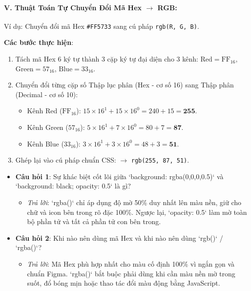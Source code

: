 \documentclass[11pt,oneside]{book}
\newcommand{\codeinline}[1]{\textcolor{accentOrange}{\texttt{#1}}}
\begin{document}
\paragraph{V. Thuật Toán Tự Chuyển Đổi Mã Hex $\rightarrow$ RGB:}
\begin{conceptBox}
Ví dụ: Chuyển đổi mã Hex \codeinline{\#FF5733} sang cú pháp \codeinline{rgb(R, G, B)}.

\textbf{Các bước thực hiện}:
\begin{enumerate}[leftmargin=1.5em, itemsep=2pt]
    \item Tách mã Hex 6 ký tự thành 3 cặp ký tự đại diện cho 3 kênh:
    $\text{Red} = \text{FF}_{16}$, $\text{Green} = 57_{16}$, $\text{Blue} = 33_{16}$.
    \item Chuyển đổi từng cặp số Thập lục phân (Hex - cơ số 16) sang Thập phân (Decimal - cơ số 10):
    \begin{itemize}[leftmargin=1.2em]
        \item Kênh Red ($\text{FF}_{16}$): $15 \times 16^1 + 15 \times 16^0 = 240 + 15 = \mathbf{255}$.
        \item Kênh Green ($57_{16}$): $5 \times 16^1 + 7 \times 16^0 = 80 + 7 = \mathbf{87}$.
        \item Kênh Blue ($33_{16}$): $3 \times 16^1 + 3 \times 16^0 = 48 + 3 = \mathbf{51}$.
    \end{itemize}
    \item Ghép lại vào cú pháp chuẩn CSS: $\rightarrow$ \codeinline{rgb(255, 87, 51)}.
\end{enumerate}
\end{conceptBox}

\begin{conceptBox}
\begin{itemize}[leftmargin=1.5em, itemsep=4pt, parsep=0pt]
    \item \textbf{Câu hỏi 1}: Sự khác biệt cốt lõi giữa `background: rgba(0,0,0,0.5)` và `background: black; opacity: 0.5` là gì?
    \begin{itemize}[leftmargin=1.2em]
        \item \textit{Trả lời}: `rgba()` chỉ áp dụng độ mờ 50\% duy nhất lên màu nền, giữ cho chữ và icon bên trong rõ đặc 100\%. Ngược lại, `opacity: 0.5` làm mờ toàn bộ phần tử và tất cả phần tử con bên trong.
    \end{itemize}
    \item \textbf{Câu hỏi 2}: Khi nào nên dùng mã Hex và khi nào nên dùng `rgb()` / `rgba()`?
    \begin{itemize}[leftmargin=1.2em]
        \item \textit{Trả lời}: Mã Hex phù hợp nhất cho màu cố định 100\% vì ngắn gọn và chuẩn Figma. `rgba()` bắt buộc phải dùng khi cần màu nền mờ trong suốt, đổ bóng mịn hoặc thao tác đổi màu động bằng JavaScript.
    \end{itemize}
\end{itemize}
\end{conceptBox}
\end{document}
